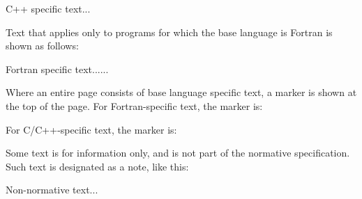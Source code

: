 \begin{cppspecific}
C++ specific text...
\end{cppspecific}

Text that applies only to programs for which the base language is Fortran is shown as follows:

\begin{fortranspecific}
Fortran specific text......
\end{fortranspecific}

Where an entire page consists of base language specific text, a marker is shown
at the top of the page.  For Fortran-specific text, the marker is:

\bigskip
{}
\bigskip

For C/C++-specific text, the marker is:

\bigskip
{}
\bigskip

Some text is for information only, and is not part of the normative specification. Such
text is designated as a note, like this:

\begin{note}
Non-normative text...
\end{note}

